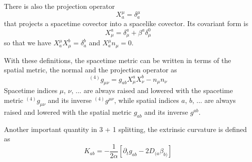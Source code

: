 \documentclass[letterpaper,nofootinbib,prd,amsmath,onecolumn]{revtex4-1}
\begin{document}
There is also the projection operator
\begin{equation}\label{projection 1}
X^{\mu}_{a} = \delta^{\mu}_{a}
\end{equation}
that projects a spacetime covector into a spacelike covector. Its covariant form is
\begin{equation}\label{projection 2}
X^{a}_{\mu} = \delta^{a}_{\mu} + \beta^{a}\delta^{0}_{\mu}
\end{equation}
so that we have $X^{\mu}_{a}X^{b}_{\mu} = \delta^{b}_{a}$ and $X^{\mu}_{a}n_{\mu} = 0$. 

With these definitions, the spacetime metric can be written in terms of the spatial metric, the normal and the projection operator as
\begin{equation}\label{spacetime metric 3 + 1}
^{\left(4\right)}g_{\mu\nu} = g_{ab}X^{a}_{\mu}X^{b}_{\nu} - n_{\mu}n_{\nu}
\end{equation}
Spacetime indices $\mu$, $\nu$, ... are always raised and lowered with the spacetime metric $^{\left(4\right)}g_{\mu\nu}$ and its inverse $^{\left(4\right)}g^{\mu\nu}$, while spatial indices $a$, $b$, ... are always raised and lowered with the spatial metric $g_{ab}$ and its inverse $g^{ab}$. 

Another important quantity in 3 + 1 splitting, the extrinsic curvature is defined as
\begin{equation}\label{extrinsic}
K_{ab} = - \frac{1}{2\alpha}\left[\partial_{t}g_{ab} - 2D_{(a}\beta_{b)}\right]
\end{equation}

\end{document}
